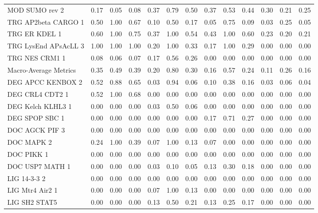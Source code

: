 \begin{tabular}{lrrrrrrrrrrrr}
MOD SUMO rev 2        &  0.17 &  0.05 &  0.08 &  0.37 &  0.79 &  0.50 &  0.37 &  0.53 &  0.44 &  0.30 &  0.21 &  0.25 \\
TRG AP2beta CARGO 1   &  0.50 &  1.00 &  0.67 &  0.10 &  0.50 &  0.17 &  0.05 &  0.75 &  0.09 &  0.03 &  0.25 &  0.05 \\
TRG ER KDEL 1         &  0.60 &  1.00 &  0.75 &  0.37 &  1.00 &  0.54 &  0.43 &  1.00 &  0.60 &  0.23 &  0.20 &  0.21 \\
TRG LysEnd APsAcLL 3  &  1.00 &  1.00 &  1.00 &  0.20 &  1.00 &  0.33 &  0.17 &  1.00 &  0.29 &  0.00 &  0.00 &  0.00 \\
TRG NES CRM1 1        &  0.08 &  0.06 &  0.07 &  0.17 &  0.56 &  0.26 &  0.00 &  0.00 &  0.00 &  0.00 &  0.00 &  0.00 \\
Macro-Average Metrics &  0.35 &  0.49 &  0.39 &  0.20 &  0.80 &  0.30 &  0.16 &  0.57 &  0.24 &  0.11 &  0.26 &  0.16 \\
DEG APCC KENBOX 2     &  0.52 &  0.88 &  0.65 &  0.03 &  0.94 &  0.06 &  0.10 &  0.38 &  0.16 &  0.03 &  0.06 &  0.04 \\
DEG CRL4 CDT2 1       &  0.52 &  1.00 &  0.68 &  0.00 &  0.00 &  0.00 &  0.00 &  0.00 &  0.00 &  0.00 &  0.00 &  0.00 \\
DEG Kelch KLHL3 1     &  0.00 &  0.00 &  0.00 &  0.03 &  0.50 &  0.06 &  0.00 &  0.00 &  0.00 &  0.00 &  0.00 &  0.00 \\
DEG SPOP SBC 1        &  0.00 &  0.00 &  0.00 &  0.00 &  0.00 &  0.00 &  0.17 &  0.71 &  0.27 &  0.00 &  0.00 &  0.00 \\
DOC AGCK PIF 3        &  0.00 &  0.00 &  0.00 &  0.00 &  0.00 &  0.00 &  0.00 &  0.00 &  0.00 &  0.00 &  0.00 &  0.00 \\
DOC MAPK 2            &  0.24 &  1.00 &  0.39 &  0.07 &  1.00 &  0.13 &  0.07 &  0.00 &  0.00 &  0.00 &  0.00 &  0.00 \\
DOC PIKK 1            &  0.00 &  0.00 &  0.00 &  0.00 &  0.00 &  0.00 &  0.00 &  0.00 &  0.00 &  0.00 &  0.00 &  0.00 \\
DOC USP7 MATH 1       &  0.00 &  0.00 &  0.00 &  0.03 &  0.10 &  0.05 &  0.13 &  0.30 &  0.18 &  0.00 &  0.00 &  0.00 \\
LIG 14-3-3 2          &  0.00 &  0.00 &  0.00 &  0.00 &  0.00 &  0.00 &  0.00 &  0.00 &  0.00 &  0.00 &  0.00 &  0.00 \\
LIG Mtr4 Air2 1       &  0.00 &  0.00 &  0.00 &  0.07 &  1.00 &  0.13 &  0.00 &  0.00 &  0.00 &  0.00 &  0.00 &  0.00 \\
LIG SH2 STAT5         &  0.00 &  0.00 &  0.00 &  0.13 &  0.50 &  0.21 &  0.13 &  0.25 &  0.17 &  0.00 &  0.00 &  0.00 \\

\end{tabular}
